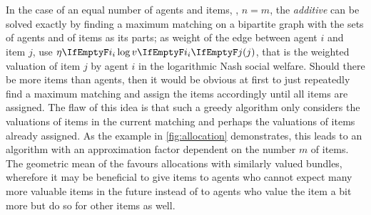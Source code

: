 \section{\texorpdfstring{\SMatch}{SMatch}}
\label{sec:smatch}

In the case of an equal number of agents and items, \ie, \(n = m\), the \emph{additive} \NSW{} can be solved exactly by finding a maximum matching on a bipartite graph with the sets of agents and of items as its parts;
as weight of the edge between agent \(i\) and item \(j\), use \(\weight \log \valuations[j]\), that is the weighted valuation of item \(j\) by agent \(i\) in the logarithmic Nash social welfare.
Should there be more items than agents, then it would be obvious at first to just repeatedly find a maximum matching and assign the items accordingly until all items are assigned.
The flaw of this idea is that such a greedy algorithm only considers the valuations of items in the current matching and perhaps the valuations of items already assigned.
As the example in \cref{fig:allocation} demonstrates, this leads to an algorithm with an approximation factor dependent on the number \(m\) of items.
The geometric mean of the \NSW{} favours allocations with similarly valued bundles, wherefore it may be beneficial to give items to agents who cannot expect many more valuable items in the future instead of to agents who value the item a bit more but do so for other items as well.

